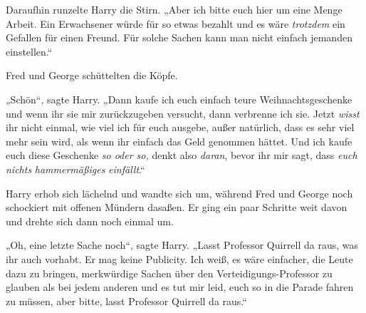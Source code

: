 Daraufhin runzelte Harry die Stirn. „Aber ich bitte euch hier um eine Menge Arbeit. Ein Erwachsener würde für so etwas bezahlt und es wäre \emph{trotzdem} ein Gefallen für einen Freund. Für solche Sachen kann man nicht einfach jemanden einstellen.“

Fred und George schüttelten die Köpfe.

„Schön“, sagte Harry. „Dann kaufe ich euch einfach teure Weihnachtsgeschenke und wenn ihr sie mir zurückzugeben versucht, dann verbrenne ich sie. Jetzt \emph{wisst} ihr nicht einmal, wie viel ich für euch ausgebe, außer natürlich, dass es sehr viel mehr sein wird, als wenn ihr einfach das Geld genommen hättet. Und ich kaufe euch diese Geschenke \emph{so oder so,} denkt also \emph{daran}, bevor ihr mir sagt, dass \emph{euch nichts} \emph{hammermäßiges} \emph{einfällt}.“%

Harry erhob sich lächelnd und wandte sich um, während Fred und George noch schockiert mit offenen Mündern dasaßen. Er ging ein paar Schritte weit davon und drehte sich dann noch einmal um.

„Oh, eine letzte Sache noch“, sagte Harry. „Lasst Professor Quirrell da raus, was ihr auch vorhabt. Er mag keine Publicity. Ich weiß, es wäre einfacher, die Leute dazu zu bringen, merkwürdige Sachen über den Verteidigungs-Professor zu glauben als bei jedem anderen und es tut mir leid, euch so in die Parade fahren zu müssen, aber bitte, lasst Professor Quirrell da raus.“

